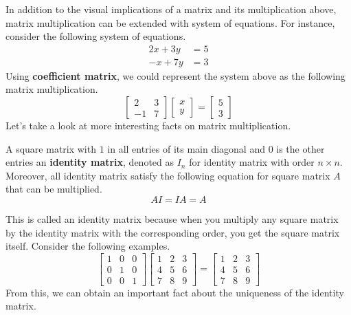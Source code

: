 \documentclass[../main.tex]{subfiles}
\begin{document}
In addition to the visual implications of a matrix and its
multiplication above, matrix multiplication can be extended with
system of equations. For instance, consider the following system
of equations.
\begin{align*}
    2x + 3y &= 5 \\
    -x + 7y &= 3
\end{align*}
Using \textbf{coefficient matrix}, we could represent the system
above as the following matrix multiplication.
\[
\begin{bmatrix}
    2  & 3 \\
    -1 & 7
\end{bmatrix}
\begin{bmatrix}
    x \\
    y
\end{bmatrix}
=
\begin{bmatrix}
    5 \\
    3
\end{bmatrix}
\]
Let's take a look at more interesting facts on matrix multiplication.

\begin{definition}
A square matrix with $1$ in all entries of its main diagonal and
$0$ is the other entries an \textbf{identity matrix}, denoted as
$I_n$ for identity matrix with order $n \times n$. Moreover,
all identity matrix satisfy the following equation for square
matrix $A$ that can be multiplied.
\[
AI = IA = A
\]
\end{definition}

This is called an identity matrix because when you multiply any
square matrix by the identity matrix with the corresponding order,
you get the square matrix itself. Consider the following examples.
\[
\begin{bmatrix}
    1 & 0 & 0 \\
    0 & 1 & 0 \\
    0 & 0 & 1
\end{bmatrix}
\begin{bmatrix}
    1 & 2 & 3 \\
    4 & 5 & 6 \\
    7 & 8 & 9
\end{bmatrix}
=
\begin{bmatrix}
    1 & 2 & 3 \\
    4 & 5 & 6 \\
    7 & 8 & 9
\end{bmatrix}
\]
From this, we can obtain an important fact about the uniqueness
of the identity matrix.
\end{document}
